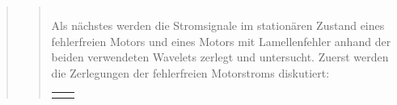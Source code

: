 \begin{quote}
\begin{quote}
\begin{center}
\begin{tabular}{ll}
                \end{tabular}
                \end{center}
                
                
                Als nächstes werden die Stromsignale im stationären Zustand
                eines fehlerfreien Motors und eines Motors mit Lamellenfehler
                anhand der beiden verwendeten Wavelets zerlegt und untersucht.
                Zuerst werden die Zerlegungen der fehlerfreien Motorstroms
                diskutiert:
                
                 \begin{center}
                \begin{tabular}{ll}
    
                \hspace{-8em}
                    \begin{minipage}{0.6\textwidth}
    

\end{minipage}
\end{tabular}
\end{center}
\end{quote}
\end{quote}
